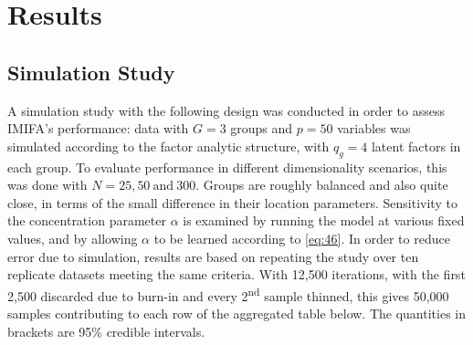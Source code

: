 \documentclass[a4paper,12pt,fleqn]{article}
\numberwithin{equation}{section}
\begin{document}
\section[Results]{Results}
\subsection[Simulation Study]{Simulation Study}
A simulation study with the following design was conducted in order to assess IMIFA's performance: data with $G=3$ groups and $p=50$ variables was simulated according to the factor analytic structure, with $q_g=4$ latent factors in each group. To evaluate performance in different dimensionality scenarios, this was done with $N=25, 50~\mbox{and}~300$. Groups are roughly balanced and also quite close, in terms of the small difference in their location parameters. Sensitivity to the concentration parameter $\alpha$ is examined by running the model at various fixed values, and by allowing $\alpha$ to be learned according to \eqref{eq:46}. In order to reduce error due to simulation, results are based on repeating the study over ten replicate datasets meeting the same criteria. With 12,500 iterations, with the first 2,500 discarded due to burn-in and every 2\textsuperscript{nd} sample thinned, this gives 50,000 samples contributing to each row of the aggregated table below. The quantities in brackets are 95\% credible intervals.\newline
\end{document}
